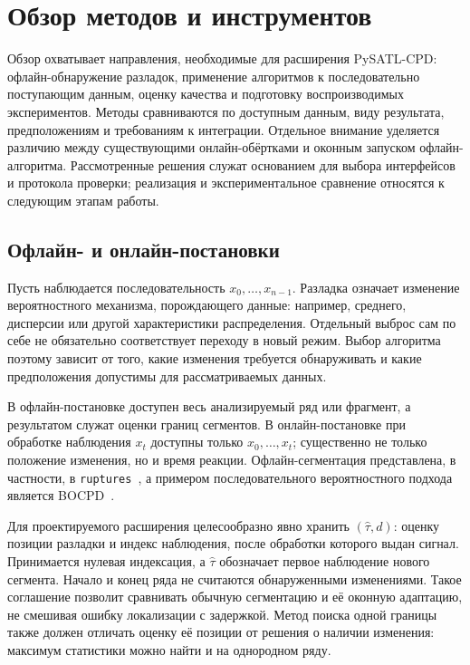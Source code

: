 \section{Обзор методов и инструментов}
\label{sec:review}

Обзор охватывает направления, необходимые для расширения PySATL-CPD:
офлайн-обнаружение разладок, применение алгоритмов к последовательно
поступающим данным, оценку качества и подготовку воспроизводимых
экспериментов. Методы сравниваются по доступным данным, виду результата,
предположениям и требованиям к интеграции. Отдельное внимание уделяется
различию между существующими онлайн-обёртками и оконным запуском
офлайн-алгоритма. Рассмотренные решения служат основанием для выбора
интерфейсов и протокола проверки; реализация и экспериментальное
сравнение относятся к следующим этапам работы.

\subsection{Офлайн- и онлайн-постановки}

Пусть наблюдается последовательность $x_0,\ldots,x_{n-1}$.
Разладка означает изменение вероятностного механизма, порождающего
данные: например, среднего, дисперсии или другой характеристики
распределения. Отдельный выброс сам по себе не обязательно соответствует
переходу в новый режим. Выбор алгоритма поэтому зависит от того,
какие изменения требуется обнаруживать и какие предположения
допустимы для рассматриваемых данных.

В офлайн-постановке доступен весь анализируемый ряд или фрагмент,
а результатом служат оценки границ сегментов. В онлайн-постановке
при обработке наблюдения $x_t$ доступны только $x_0,\ldots,x_t$;
существенно не только положение изменения, но и время реакции.
Офлайн-сегментация представлена, в частности, в
\texttt{ruptures}~\cite{ruptures}, а примером последовательного
вероятностного подхода является BOCPD~\cite{adams2007}.

Для проектируемого расширения целесообразно явно хранить
$(\hat\tau,d)$: оценку позиции разладки и индекс наблюдения,
после обработки которого выдан сигнал. Принимается нулевая индексация,
а $\hat\tau$ обозначает первое наблюдение нового сегмента.
Начало и конец ряда не считаются обнаруженными изменениями.
Такое соглашение позволит сравнивать обычную сегментацию и её
оконную адаптацию, не смешивая ошибку локализации с задержкой.
Метод поиска одной границы также должен отличать оценку её позиции
от решения о наличии изменения: максимум статистики можно найти
и на однородном ряду.

